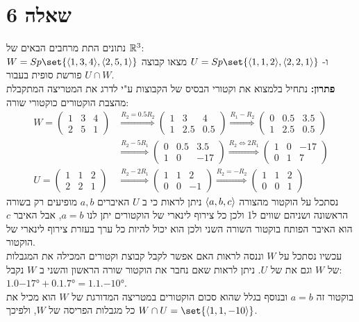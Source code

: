\documentclass{article}
\DeclarePairedDelimiter\set\{\}
\begin{document}
		\section*{שאלה 6}
		נתונים התת מרחבים הבאים של $\mathbb{R}^3$: \\
		$W = Sp\set{\ang{1,3,4}, \ang{2,5,1}}$ ו- $U = Sp\set{\ang{1,1,2}, \ang{2,2,1}}$
		מצאו קבוצה פורשת סופית בעבור $U \cap W$. \\
		\textbf{פתרון:} נתחיל בלמצוא את וקטורי הבסיס של הקבוצות ע"י לדרג את המטריצה המתקבלת מהצבת הוקטורים כוקטורי שורה:
		\begin{align*}
		W = \begin{pmatrix}
			1 & 3 & 4 \\
			2 & 5 & 1
		\end{pmatrix}
		&\overset{R_2 = 0.5R_2}\Rightarrow
		\begin{pmatrix}
			1 & 3 & 4 \\
			1 & 2.5 & 0.5
		\end{pmatrix}
		\overset{R_1 - R_2}\Rightarrow
		\begin{pmatrix}
			0 & 0.5 & 3.5 \\
			1 & 2.5 & 0.5
		\end{pmatrix} \\
		&\overset{R_2 - 5R_1}\Rightarrow
		\begin{pmatrix}
			0 & 0.5 & 3.5 \\
			1 & 0 & -17
		\end{pmatrix}
		\overset{R_2 \Leftrightarrow 2R_1}\Rightarrow
		\boxed{\begin{pmatrix}
			1 & 0 & -17 \\
			0 & 1 & 7
		\end{pmatrix}} \\
		U = \begin{pmatrix}
			1 & 1 & 2 \\
			2 & 2 & 1
		\end{pmatrix}
		&\overset{R_2 - 2R_1}\Rightarrow
		\begin{pmatrix}
			1 & 1 & 2 \\
			0 & 0 & -1
		\end{pmatrix}
		\overset{R_2 = -R_2}\Rightarrow
		\boxed{\begin{pmatrix}
			1 & 1 & 2 \\
			0 & 0 & 1
		\end{pmatrix}}
	\end{align*}
	נסתכל על הוקטור מהצורה $\langle a,b,c \rangle$ ניתן לראות כי ב $U$ האיברים $a,b$ מופיעים רק בשורה הראשונה ושניהם שווים ל1 ולכן כל צירוף לינארי של הוקטורים יתן לנו $a=b$,
	אבל האיבר $c$ הוא האיבר הפותח בוקטור השורה השני ולכן הוא יכול להיות כל ערך בעזרת צירוף לינארי של הוקטור. \\
	עכשיו נסתכל על $W$ וננסה לראות האם אפשר לקבל קבוצת וקטורים המכילה את המגבלות של $W$ וגם את של $U$.
	ניתן לראות שאם נחבר את הוקטור שורה הראשון והשני ב $W$ נקבל: $\ang{1,0-17} + \ang{0,1,7} = \ang{1,1,-10}$. \\
	בוקטור זה $a=b$ ובנוסף בגלל שהוא סכום הוקטורים במטריצה המדורגת של $W$ הוא מכיל את כל מגבלות הפריסה של $W$, ולפיכך $W \cap U = \set{\ang{1,1,-10}}$.
\end{document}
